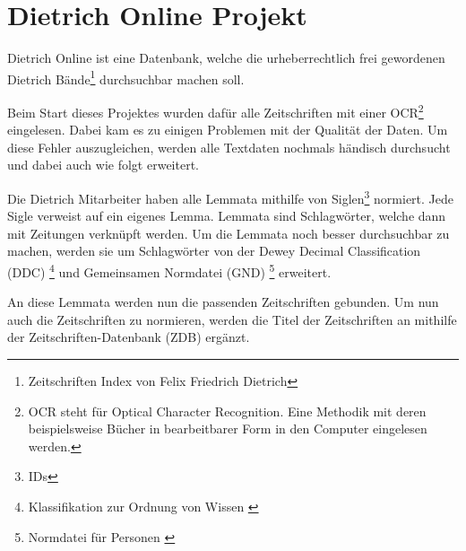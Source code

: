\chapter{Dietrich Online Projekt}
\label{dietrichonline}

Dietrich Online ist eine Datenbank, welche die urheberrechtlich frei gewordenen Dietrich Bände\footnote{Zeitschriften Index von Felix Friedrich Dietrich} durchsuchbar machen soll. 

Beim Start dieses Projektes wurden dafür alle Zeitschriften mit einer OCR\footnote{OCR steht für Optical Character Recognition. Eine Methodik mit deren beispielsweise Bücher in bearbeitbarer Form in den Computer eingelesen werden.} eingelesen. Dabei kam es zu einigen Problemen mit der Qualität der Daten. Um diese Fehler auszugleichen, werden alle Textdaten nochmals händisch durchsucht und dabei auch wie folgt erweitert.

Die Dietrich Mitarbeiter haben alle Lemmata mithilfe von Siglen\footnote{IDs} normiert. Jede Sigle verweist auf ein eigenes Lemma. Lemmata sind Schlagwörter, welche dann mit Zeitungen verknüpft werden. Um die Lemmata noch besser durchsuchbar zu machen, werden sie um Schlagwörter von der Dewey Decimal Classification (DDC)  \footnote{Klassifikation zur Ordnung von Wissen \cite{DeutscheNationalBibliothek.ddc}} und Gemeinsamen Normdatei (GND)  \footnote{Normdatei für Personen \cite{DeutscheNationalBibliothek.2019b}}
erweitert.

An diese Lemmata werden nun die passenden Zeitschriften gebunden. Um nun auch die Zeitschriften zu normieren, werden die Titel der Zeitschriften an mithilfe der Zeitschriften-Datenbank (ZDB) ergänzt. 
\cite{UniversityofTrier.2016}